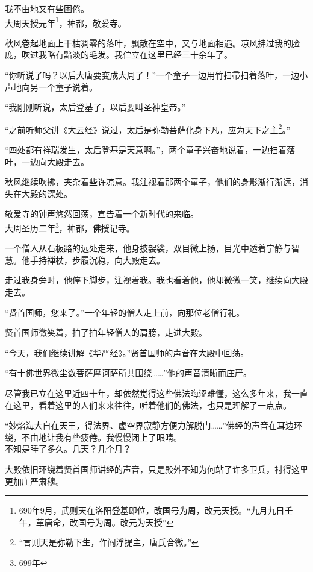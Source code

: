 \documentclass[UTF8,openany]{ctexbook}
\begin{document}
我不由地又有些困倦。\\[0.5em]

大周天授元年\footnote{690年9月，武则天在洛阳登基即位，改国号为周，改元天授。“九月九日壬午，革唐命，改国号为周。改元为天授”\cite{bi:jts}}，神都，敬爱寺。

秋风卷起地面上干枯凋零的落叶，飘散在空中，又与地面相遇。凉风拂过我的脸庞，吹过我略有黯淡的毛发。我伫立在这里已经三十余年了。

“你听说了吗？以后大唐要变成大周了！”一个童子一边用竹扫帚扫着落叶，一边小声地向另一个童子说着。

“我刚刚听说，太后登基了，以后要叫圣神皇帝。”

“之前听师父讲《大云经》说过，太后是弥勒菩萨化身下凡，应为天下之主\footnote{“言则天是弥勒下生，作阎浮提主，唐氏合微。”\cite{bi:jts2}}。”

“四处都有祥瑞发生，太后登基是天意啊。”，两个童子兴奋地说着，一边扫着落叶，一边向大殿走去。

秋风继续吹拂，夹杂着些许凉意。我注视着那两个童子，他们的身影渐行渐远，消失在大殿的深处。

敬爱寺的钟声悠然回荡，宣告着一个新时代的来临。\\[1em]

大周圣历二年\footnote{699年}，神都，佛授记寺。

一个僧人从石板路的远处走来，他身披袈裟，双目微上扬，目光中透着宁静与智慧。他手持禅杖，步履沉稳，向大殿走去。

走过我身旁时，他停下脚步，注视着我。我也看着他，他却微微一笑，继续向大殿走去。

“贤首国师，您来了。”一个年轻的僧人走上前，向那位老僧行礼。

贤首国师微笑着，拍了拍年轻僧人的肩膀，走进大殿。

“今天，我们继续讲解《华严经》。”贤首国师的声音在大殿中回荡。

“有十佛世界微尘数菩萨摩诃萨所共围绕\cite{bi:hyo}……”他的声音清晰而庄严。

尽管我已立在这里近四十年，却依然觉得这些佛法晦涩难懂，这么多年来，我一直在这里，看着这里的人们来来往往，听着他们的佛法，也只是理解了一点点。

“妙焰海大自在天王，得法界、虚空界寂静方便力解脱门\cite{bi:hyo}……”佛经的声音在耳边环绕，不由地让我有些疲倦。我慢慢闭上了眼睛。\\[1em]

不知是睡了多久。几天？几个月？

大殿依旧环绕着贤首国师讲经的声音，只是殿外不知为何站了许多卫兵，衬得这里更加庄严肃穆。
\end{document}
